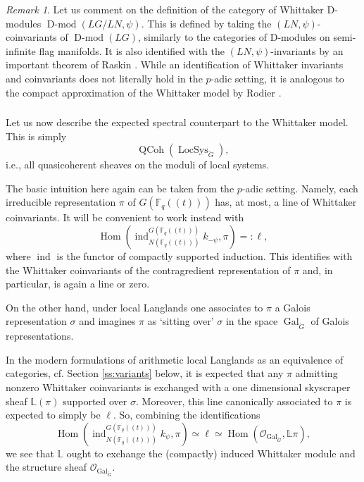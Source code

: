 \documentclass[10pt]{amsart}
\newcommand{\LS}{\on{LocSys}_{\cG}}
\newcommand{\Fqt}{\Fq(\!(t)\!)}
\newcommand{\on}{\operatorname}
\newcommand{\Dmod}{\on{D-mod}}
\newcommand{\Fq}{\mathbb{F}_q}
\theoremstyle{remark}
\newtheorem{re}[subsubsection]{Remark}
\newcommand{\Hom}{\operatorname{Hom}}
\newcommand{\OO}{\mathscr{O}}
\numberwithin{equation}{section}
\newcommand{\cG}{\check{G}}
\newcommand{\QCoh}{\on{QCoh}}
\begin{document}
	
\begin{re} Let us comment on the definition of the category of 
Whittaker D-modules $\Dmod(LG / LN, 
\psi)$. This is defined by taking the $(LN, \psi)$-coinvariants of $\Dmod(LG)$, similarly to the categories of D-modules on semi-infinite flag manifolds. It is also identified with the $(LN, 
\psi)$-invariants by an 
important theorem of Raskin \cite{whit}. While an identification of Whittaker invariants and coinvariants does not literally hold in the $p$-adic setting, it is analogous to the compact approximation of the Whittaker model by Rodier \cite{rodier}.   
\end{re}	


\subsubsection{}Let us now describe the expected spectral counterpart to the 
Whittaker 
	model. This 
	is simply $$\QCoh(\LS),$$ i.e., all quasicoherent sheaves on the moduli of 
	local systems. 
	
	The basic intuition here again can be taken from the 
	$p$-adic setting. Namely, each irreducible representation $\pi$ of 
	$G(\Fqt)$ has, at 
	most, a line of Whittaker coinvariants. It will be convenient to work instead with
	\[
	   \Hom( \on{ind}_{N(\Fqt)}^{G(\Fqt)} k_{-\psi}, \pi) =: \ell,
	\]
	where $\on{ind}$ is the functor of compactly supported induction. This identifies with the Whittaker coinvariants of the contragredient representation of $\pi$ and, in particular, is again a line or zero. 
	
	
	On the other hand, under 
	local Langlands one associates to $\pi$ a Galois representation $\sigma$ and imagines $\pi$ as `sitting over' $\sigma$ in the space $\on{Gal}_{\cG}$ 
	of Galois 
	representations. 
	
	In the modern formulations of arithmetic local Langlands as an 
	equivalence of categories, cf. Section \ref{ss:variants} below, it is expected that any $\pi$ admitting nonzero Whittaker coinvariants is exchanged with a one dimensional skyscraper sheaf $\mathbb{L}(\pi)$ supported over $\sigma$. Moreover, this line canonically associated to $\pi$ is expected to simply be $\ell$. So, combining the identifications 
	\[
	    \Hom( \on{ind}_{N(\Fqt)}^{G(\Fqt)} k_\psi, \pi) \simeq \ell \simeq 
	    \Hom( \OO_{\on{Gal}_{\cG}},  \mathbb{L} \pi ), 
	\]
	we see that $\mathbb{L}$ ought to exchange the (compactly) induced Whittaker module and the structure sheaf $\OO_{\on{Gal}_{\cG}}$. 
	
\end{document}
